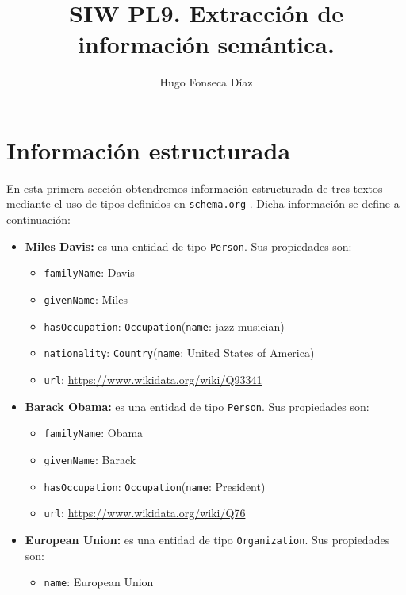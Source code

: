 \documentclass[11pt]{article}
\begin{document}
\title{SIW PL9. Extracción de información semántica.}
\author{Hugo Fonseca Díaz\\ }
\maketitle
\section{Información estructurada}
En esta primera sección obtendremos información estructurada de tres textos mediante el uso de tipos definidos en \verb|schema.org| \cite{schemaorg}. Dicha información se define a continuación:

\begin{itemize}
    \item \textbf{Miles Davis:} es una entidad de tipo \verb|Person|. Sus propiedades son:
        \begin{itemize}
            \item \verb|familyName|: Davis
            \item \verb|givenName|: Miles
            \item \verb|hasOccupation|: \verb|Occupation|(\verb|name|: jazz musician)
            \item \verb|nationality|: \verb|Country|(\verb|name|: United States of America)
            \item \verb|url|: \url{https://www.wikidata.org/wiki/Q93341}
        \end{itemize}
    \item \textbf{Barack Obama:} es una entidad de tipo \verb|Person|. Sus propiedades son:
        \begin{itemize}
            \item \verb|familyName|: Obama
            \item \verb|givenName|: Barack
            \item \verb|hasOccupation|: \verb|Occupation|(\verb|name|: President)
            \item \verb|url|: \url{https://www.wikidata.org/wiki/Q76}
        \end{itemize}
    \item \textbf{European Union:} es una entidad de tipo \verb|Organization|. Sus propiedades son:
        \begin{itemize}
            \item \verb|name|: European Union

\end{itemize}
\end{itemize}
\end{document}
